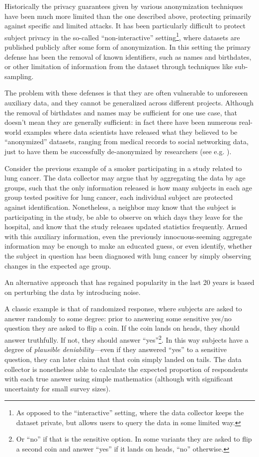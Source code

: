 Historically the privacy guarantees given by various anonymization techniques have been much more limited than the one described above, protecting primarily against specific and limited attacks. It has been particularly difficult to protect subject privacy in the so-called ``non-interactive'' setting\footnote{As opposed to the ``interactive'' setting, where the data collector keeps the dataset private, but allows users to query the data in some limited way.}, where datasets are published publicly after some form of anonymization. In this setting the primary defense has been the removal of known identifiers, such as names and birthdates, or other limitation of information from the dataset through techniques like sub-sampling.

The problem with these defenses is that they are often vulnerable to unforeseen auxiliary data, and they cannot be generalized across different projects. Although the removal of birthdates and names may be sufficient for one use case, that doesn't mean they are generally sufficient: in fact there have been numerous real-world examples where data scientists have released what they believed to be ``anonymized'' datasets, ranging from medical records to social networking data, just to have them be successfully de-anonymized by researchers (see e.g. \cite{reidentification2011}).

Consider the previous example of a smoker participating in a study related to lung cancer. The data collector may argue that by aggregating the data by age groups, such that the only information released is how many subjects in each age group tested positive for lung cancer, each individual subject are protected against identification. Nonetheless, a neighbor may know that the subject is participating in the study, be able to observe on which days they leave for the hospital, and know that the study releases updated statistics frequently. Armed with this auxiliary information, even the previously innocuous-seeming aggregate information may be enough to make an educated guess, or even identify, whether the subject in question has been diagnosed with lung cancer by simply observing changes in the expected age group. \bigskip

An alternative approach that has regained popularity in the last 20 years is based on perturbing the data by introducing noise.

A classic example is that of randomized response, where subjects are asked to answer randomly to some degree: prior to answering some sensitive yes/no question they are asked to flip a coin. If the coin lands on heads, they should answer truthfully. If not, they should answer ``yes''\footnote{Or ``no'' if that is the sensitive option. In some variants they are asked to flip a second coin and answer ``yes'' if it lands on heads, ``no'' otherwise.}. In this way subjects have a degree of \emph{plausible deniability}---even if they answered ``yes'' to a sensitive question, they can later claim that that coin simply landed on tails. The data collector is nonetheless able to calculate the expected proportion of respondents with each true answer using simple mathematics (although with significant uncertainty for small survey sizes).

